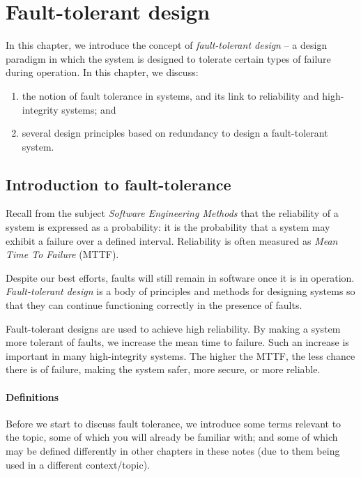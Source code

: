 \chapter{Fault-tolerant design}

In this chapter, we introduce the concept of \emph{fault-tolerant design} -- a design paradigm in which the system is designed to tolerate certain types of failure during operation. In this chapter, we discuss:

\begin{enumerate}

 \item the notion of fault tolerance in systems, and its    link to reliability and high-integrity systems; and

 \item several design principles based on redundancy to design a    fault-tolerant system.

\end{enumerate}

\section{Introduction to fault-tolerance}
\label{sec:fault-tolerance:intro}

Recall from the subject \emph{Software Engineering Methods} that the reliability of   a system is expressed as a probability: it is the probability that a system may exhibit a failure over a defined interval. Reliability is often measured as \emph{Mean Time To Failure} (MTTF).

Despite our best efforts, faults will still remain in software once it is in operation. {\em Fault-tolerant design} is a body of principles and methods for designing systems so that they can continue functioning correctly in the presence of faults.

Fault-tolerant designs are used to achieve high reliability. By making a system more tolerant of faults, we increase the mean time to failure. Such an increase is important in many high-integrity systems. The higher the MTTF, the less chance there is of failure, making the system safer, more secure, or more reliable.


\subsubsection*{Definitions}

Before we start to discuss fault tolerance, we introduce some terms relevant to the topic, some of which you will already be familiar with; and some of which may be defined differently in other chapters in these notes (due to them being used in a different context/topic).

